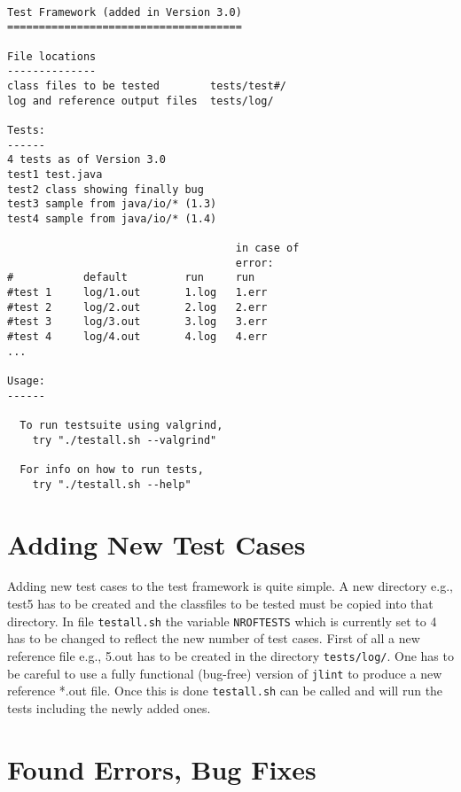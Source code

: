\documentclass[11pt,twoside,a4paper,draft]{article}
\begin{document}
\begin{verbatim}

Test Framework (added in Version 3.0)
=====================================

File locations
--------------
class files to be tested        tests/test#/
log and reference output files  tests/log/

Tests:
------
4 tests as of Version 3.0
test1 test.java
test2 class showing finally bug
test3 sample from java/io/* (1.3)
test4 sample from java/io/* (1.4)

                                    in case of
                                    error:
#           default         run     run
#test 1     log/1.out       1.log   1.err
#test 2     log/2.out       2.log   2.err
#test 3     log/3.out       3.log   3.err
#test 4     log/4.out       4.log   4.err
...

Usage:
------

  To run testsuite using valgrind, 
	try "./testall.sh --valgrind"

  For info on how to run tests, 
	try "./testall.sh --help"

\end{verbatim}



\section {Adding New Test Cases}

Adding new test cases to the test framework is quite simple. A new directory
 e.g., test5 has to be created and the classfiles to be tested must be copied
 into that directory. In file \texttt{testall.sh} the variable
 \texttt{NROFTESTS} which is currently set to 4 has to be changed to reflect 
the new number of test cases. First of all a new reference file e.g., 5.out
 has to be created in the directory \texttt{tests/log/}. One has to be careful
 to use a fully functional (bug-free) version of \texttt{jlint} to produce a
 new reference *.out file. Once this is done \texttt{testall.sh} can be called
 and will run the tests including the newly added ones.

\section {Found Errors, Bug Fixes}
\end{document}
